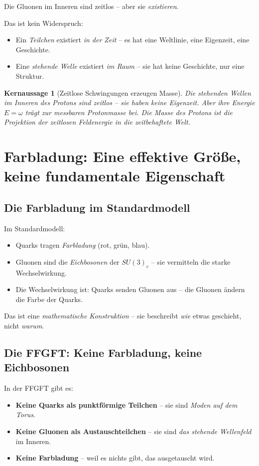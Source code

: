 \documentclass[11pt,a4paper]{article}
\newtheorem{keyresult}{Kernaussage}
\begin{document}
	Die Gluonen im Inneren sind zeitlos -- aber sie \emph{existieren}.
	
	Das ist kein Widerspruch:
	\begin{itemize}
		\item Ein \emph{Teilchen} existiert \emph{in der Zeit} -- es hat eine Weltlinie, eine Eigenzeit, eine Geschichte.
		\item Eine \emph{stehende Welle} existiert \emph{im Raum} -- sie hat keine Geschichte, nur eine Struktur.
	\end{itemize}
	
	\begin{keyresult}[Zeitlose Schwingungen erzeugen Masse]
		Die stehenden Wellen im Inneren des Protons sind zeitlos -- sie haben keine Eigenzeit. 
		Aber ihre Energie \(E = \omega\) trägt zur messbaren Protonmasse bei. 
		Die Masse des Protons ist die \emph{Projektion} der zeitlosen Feldenergie in die zeitbehaftete Welt.
	\end{keyresult}
	
	\section{Farbladung: Eine effektive Größe, keine fundamentale Eigenschaft}
	
	\subsection{Die Farbladung im Standardmodell}
	
	Im Standardmodell:
	\begin{itemize}
		\item Quarks tragen \emph{Farbladung} (rot, grün, blau).
		\item Gluonen sind die \emph{Eichbosonen} der \(SU(3)_c\) -- sie vermitteln die starke Wechselwirkung.
		\item Die Wechselwirkung ist: Quarks senden Gluonen aus -- die Gluonen ändern die Farbe der Quarks.
	\end{itemize}
	
	Das ist eine \emph{mathematische Konstruktion} -- sie beschreibt \emph{wie} etwas geschieht, nicht \emph{warum}.
	
	\subsection{Die FFGFT: Keine Farbladung, keine Eichbosonen}
	
	In der FFGFT gibt es:
	\begin{itemize}
		\item \textbf{Keine Quarks als punktförmige Teilchen} -- sie sind \emph{Moden auf dem Torus}.
		\item \textbf{Keine Gluonen als Austauschteilchen} -- sie sind \emph{das stehende Wellenfeld} im Inneren.
		\item \textbf{Keine Farbladung} -- weil es nichts gibt, das ausgetauscht wird.
	\end{itemize}
	
\end{document}
